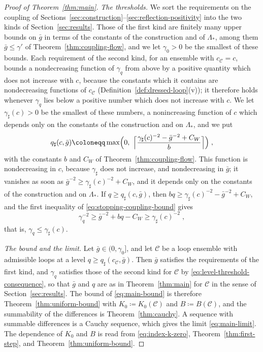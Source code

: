 \documentclass[11pt]{preprint}
\numberwithin{equation}{section}
\theoremstyle{definition}
\theoremstyle{remark}
\theoremstyle{plain}
\begin{document}
\begin{proof}[Proof of Theorem~\ref{thm:main}]
\emph{The thresholds.} We sort the requirements on the coupling of Sections~\ref{sec:construction}--\ref{sec:reflection-positivity} into the two kinds of Section~\ref{sec:results}. Those of the first kind are finitely many upper bounds on $\bar g$ in terms of the constants of the construction and of $\Lambda_*$, among them $\bar g \leq \gamma'$ of Theorem~\ref{thm:coupling-flow}, and we let $\gamma_0 > 0$ be the smallest of these bounds. Each requirement of the second kind, for an ensemble with $c_{\mathcal C} = c$, bounds a nondecreasing function of $\gamma_q$ from above by a positive quantity which does not increase with $c$, because the constants which it contains are nondecreasing functions of $c_{\mathcal C}$ (Definition~\ref{def:dressed-loop}(v)); it therefore holds whenever $\gamma_q$ lies below a positive number which does not increase with $c$. We let $\gamma_\sharp(c) > 0$ be the smallest of these numbers, a nonincreasing function of $c$ which depends only on the constants of the construction and on $\Lambda_*$, and we put
\begin{equation}\label{eq:level-threshold}
    q_\sharp(c, \bar g) \coloneqq \max\Bigl(0,\ \Bigl\lceil\frac{\gamma_\sharp(c)^{-2} - \bar g^{-2} + C_W}{b}\Bigr\rceil\Bigr)\;,
\end{equation}
with the constants $b$ and $C_W$ of Theorem~\ref{thm:coupling-flow}. This function is nondecreasing in $c$, because $\gamma_\sharp$ does not increase, and nondecreasing in $\bar g$; it vanishes as soon as $\bar g^{-2} \geq \gamma_\sharp(c)^{-2} + C_W$, and it depends only on the constants of the construction and on $\Lambda_*$. If $q \geq q_\sharp(c, \bar g)$, then $bq \geq \gamma_\sharp(c)^{-2} - \bar g^{-2} + C_W$, and the first inequality of \eqref{eq:stopping-coupling-bound} gives
\begin{equation}\label{eq:level-threshold-consequence}
    \gamma_q^{-2} \geq \bar g^{-2} + bq - C_W \geq \gamma_\sharp(c)^{-2}\;,
\end{equation}
that is, $\gamma_q \leq \gamma_\sharp(c)$.

\emph{The bound and the limit.} Let $\bar g \in (0, \gamma_0]$, and let $\mathcal C$ be a loop ensemble with admissible loops at a level $q \geq q_\sharp(c_{\mathcal C}, \bar g)$. Then $\bar g$ satisfies the requirements of the first kind, and $\gamma_q$ satisfies those of the second kind for $\mathcal C$ by \eqref{eq:level-threshold-consequence}, so that $\bar g$ and $q$ are as in Theorem~\ref{thm:main} for $\mathcal C$ in the sense of Section~\ref{sec:results}. The bound of \eqref{eq:main-bound} is therefore Theorem~\ref{thm:uniform-bound} with $K_0 \coloneqq K_0(\mathcal C)$ and $B \coloneqq B(\mathcal C)$, and the summability of the differences is Theorem~\ref{thm:cauchy}. A sequence with summable differences is a Cauchy sequence, which gives the limit \eqref{eq:main-limit}. The dependence of $K_0$ and $B$ is read from \eqref{eq:index-k-zero}, Theorem~\ref{thm:first-step}, and Theorem~\ref{thm:uniform-bound}.
\end{proof}
\end{document}
